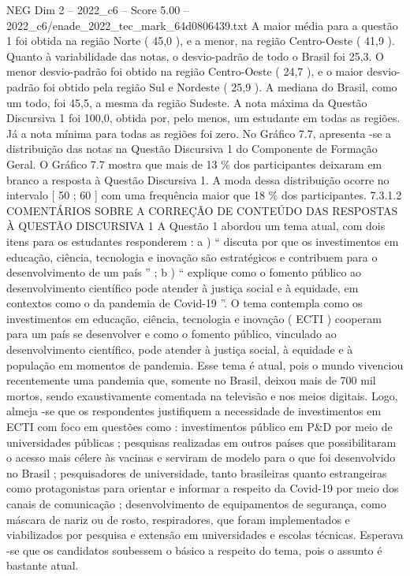 \begin{textsample}{NEG Dim 2 – 2022\_c6 – Score 5.00 – 2022\_c6/enade\_2022\_tec\_mark\_64d0806439.txt}
A maior média para a questão 1 foi obtida na região Norte ( 45,0 ), e a menor, na região Centro-Oeste ( 41,9 ).
Quanto à variabilidade das notas, o desvio-padrão de todo o Brasil foi 25,3.
O menor desvio-padrão foi obtido na região Centro-Oeste ( 24,7 ), e o maior desvio-padrão foi obtido pela região Sul e Nordeste ( 25,9 ).
A mediana do Brasil, como um todo, foi 45,5, a mesma da região Sudeste.
A nota máxima da Questão Discursiva 1 foi 100,0, obtida por, pelo menos, um estudante em todas as regiões.
Já a nota mínima para todas as regiões foi zero.
No Gráfico 7.7, apresenta -se a distribuição das notas na Questão Discursiva 1 do Componente de Formação Geral.
O Gráfico 7.7 mostra que mais de 13 \% dos participantes deixaram em branco a resposta à Questão Discursiva 1.
A moda dessa distribuição ocorre no intervalo [ 50 ; 60 ] com uma frequência maior que 18 \% dos participantes. 7.3.1.2 COMENTÁRIOS SOBRE A CORREÇÃO DE CONTEÚDO DAS RESPOSTAS À QUESTÃO DISCURSIVA 1 A Questão 1 abordou um tema atual, com dois itens para os estudantes responderem : a ) “ discuta por que os investimentos em educação, ciência, tecnologia e inovação são estratégicos e contribuem para o desenvolvimento de um país ” ; b ) “ explique como o fomento público ao desenvolvimento científico pode atender à justiça social e à equidade, em contextos como o da pandemia de Covid-19 ”.
O tema contempla como os investimentos em educação, ciência, tecnologia e inovação ( ECTI ) cooperam para um país se desenvolver e como o fomento público, vinculado ao desenvolvimento científico, pode atender à justiça social, à equidade e à população em momentos de pandemia.
Esse tema é atual, pois o mundo vivenciou recentemente uma pandemia que, somente no Brasil, deixou mais de 700 mil mortos, sendo exaustivamente comentada na televisão e nos meios digitais.
Logo, almeja -se que os respondentes justifiquem a necessidade de investimentos em ECTI com foco em questões como : investimentos público em P\&D por meio de universidades públicas ; pesquisas realizadas em outros países que possibilitaram o acesso mais célere às vacinas e serviram de modelo para o que foi desenvolvido no Brasil ; pesquisadores de universidade, tanto brasileiras quanto estrangeiras como protagonistas para orientar e informar a respeito da Covid-19 por meio dos canais de comunicação ; desenvolvimento de equipamentos de segurança, como máscara de nariz ou de rosto, respiradores, que foram implementados e viabilizados por pesquisa e extensão em universidades e escolas técnicas.
Esperava -se que os candidatos soubessem o básico a respeito do tema, pois o assunto é bastante atual.

\end{textsample}

